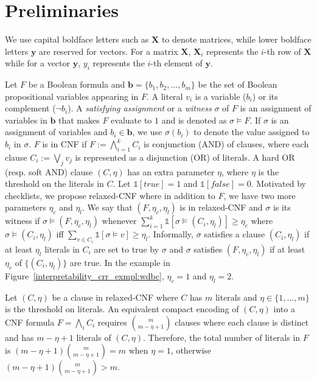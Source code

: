 \section{Preliminaries}
\label{interpretability_crr_sec:preliminaries}
We use capital  boldface letters such as $\mathbf{X}$ to denote matrices, while lower boldface letters $\mathbf{y}$ are reserved for vectors. For a matrix $\mathbf{X}$, $\mathbf{X}_i$  represents the $ i $-th row of $\mathbf{X}$ while for a vector $\mathbf{y}$, $y_i$ represents the $ i $-th element of $\mathbf{y}$. 


Let $F$ be a Boolean formula and  $\mathbf{b} = \{b_1,b_2,\dots ,b_m \}$ be the set of Boolean propositional variables appearing in $F$. A literal $ v_i $ is a variable ($b_i$) or its complement ($\neg b_i$).  A \emph{satisfying assignment} or a \emph{witness} $ \sigma $ of $F$ is an assignment of variables in $\mathbf{b}$ that makes $F$ evaluate to $ 1 $ and is denoted as $ \sigma \models F $.  If $\sigma$ is an assignment of variables and $b_i \in \mathbf{b}$, we use $\sigma(b_i)$ to denote the value assigned to $b_i$ in $\sigma$. $F$ is in CNF if $F :=  \bigwedge_{i=1}^k C_i$ is conjunction (AND) of clauses, where each clause $C_i :=  \bigvee_j v_j $  is represented as a disjunction (OR) of literals.  {A hard OR (resp. soft AND) clause $ (C,\eta) $ has an extra parameter $ \eta $, where $ \eta $ is the threshold on the literals in $ C $.} Let $ \mathbb{1}[true]=1 $ and $ \mathbb{1}[false]=0 $. Motivated by checklists, we propose relaxed-CNF where in addition to $F$, we have two more parameters $\eta_c$ and $\eta_l$. We say that $(F,\eta_c, \eta_l)$ is in relaxed-CNF and $ \sigma $ is its witness if $\sigma \models (F,\eta_c, \eta_l)$ whenever $\sum_{i=1}^k \mathbb{1}[\sigma \models (C_i,\eta_l)] \ge \eta_c$ where $\sigma \models (C_i, \eta_l)$ iff $\sum_{v \in C_i} \mathbb{1}[\sigma \models v] \geq \eta_l$. Informally,  $\sigma$ satisfies a clause $(C_i, \eta_l)$ if  at least $\eta_l$ literals in $C_i$ are set to true by $\sigma$ and $\sigma$ satisfies $(F,\eta_c, \eta_l)$ if at least $\eta_c$ of $\{(C_i,\eta_l)\}$ are true. In the  example in Figure~\ref{interpretability_crr_exmpl:wdbc}, $ \eta_c=1 $ and $ \eta_l=2 $. 


\begin{theorem}
	\label{interpretability_crr_thm:succinctness}	
	Let $ (C,\eta) $ be a clause in relaxed-CNF where  $ C $ has $ m  $ literals and $ \eta \in \{1,\dots,m\} $ is the threshold on literals.  An equivalent compact encoding of $ (C,\eta) $  into a CNF formula $ F= \bigwedge_i C_i $ requires $ {m \choose{m-\eta+1}} $  clauses where each clause is distinct and has $ m-\eta+1 $ literals of $ (C,\eta) $. Therefore,  the total number of literals in $ F $ is $ (m-\eta+1){m\choose{m-\eta+1}} = m $ when $ \eta=1 $, otherwise $ (m-\eta+1){m\choose{m-\eta+1}} > m $.
\end{theorem}


